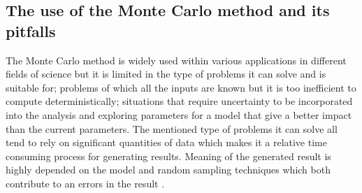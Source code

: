 \subsection{The use of the Monte Carlo method and its pitfalls}
The Monte Carlo method is widely used within various applications in different fields of science but it is limited in the type of problems it can solve and is suitable for; problems of which all the inputs are known but it is too inefficient to compute deterministically; situations that require uncertainty to be incorporated into the analysis and exploring parameters for a model that give a better impact than the current parameters. The mentioned type of problems it can solve all tend to rely on significant quantities of data which makes it a relative time consuming process for generating results. Meaning of the generated result is highly depended on the model and random sampling techniques which both contribute to an errors in the result \cite{stephanie_monte_2015,wikipedia_monte_2019,alon_honig_introduction_nodate}.

